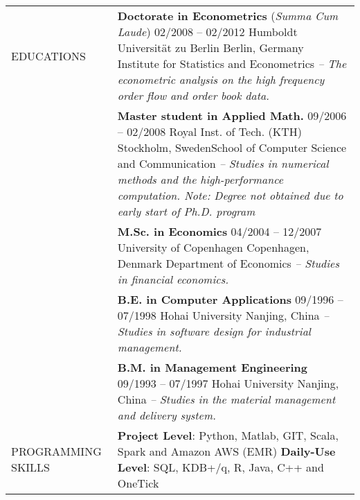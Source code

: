 \documentclass[a4paper,10pt]{article}
\begin{document}
\begin{longtable}[h]{p{}p{}}
EDUCATIONS
& \textbf{Doctorate in Econometrics} \small{(\emph{Summa Cum Laude})} \hfill 02/2008 -- 02/2012 \newline Humboldt Universit\"at zu Berlin \hfill Berlin, Germany \newline Institute for Statistics and Econometrics\newline
    \emph{-- The econometric analysis on the high frequency order flow and order book data.}\\
  & \textbf{Master student in Applied Math.} \hfill 09/2006 -- 02/2008 \newline Royal Inst. of Tech. (KTH) \hfill Stockholm, Sweden\newline School of Computer Science and Communication \newline
  \emph{-- Studies in numerical methods and the high-performance computation. Note: Degree not obtained due to early start of Ph.D. program } \\
  & \textbf{M.Sc. in Economics} \hfill 04/2004 -- 12/2007 \newline University of Copenhagen \hfill Copenhagen, Denmark  \newline Department of Economics \newline\emph{-- Studies in financial economics.}\\
  & \textbf{B.E. in Computer Applications} \hfill 09/1996 -- 07/1998 \newline Hohai University \hfill Nanjing, China \newline\emph{-- Studies in software design for industrial management.}\\
  & \textbf{B.M. in Management Engineering} \hfill 09/1993 -- 07/1997 \newline Hohai University \hfill Nanjing, China \newline\emph{-- Studies in the material management and delivery system.}\newline\\
PROGRAMMING \newline SKILLS
& \textbf{Project Level}: Python, Matlab,  GIT, Scala, Spark and Amazon AWS (EMR)  \newline
    \textbf{Daily-Use Level}: SQL, KDB+/q, R, Java, C++ and OneTick \\
\end{longtable}
\end{document}
